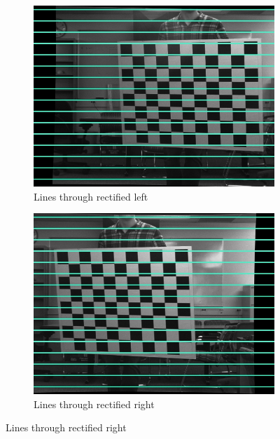 \documentclass[12pt,a4paper,final]{article}
\begin{document}
\begin{figure}[H]
\centering
\begin{subfigure}{.5\textwidth}
  \centering
  \includegraphics[width=.9\linewidth]{linesRemapL}
  \caption{Lines through rectified left}
  \label{fig:sub1}
\end{subfigure}%
\begin{subfigure}{.5\textwidth}
  \centering
  \includegraphics[width=.9\linewidth]{linesRemapR}
  \caption{Lines through rectified right}
  \label{fig:sub2}
\end{subfigure}
\label{fig:test}
\end{figure}
\end{document}

